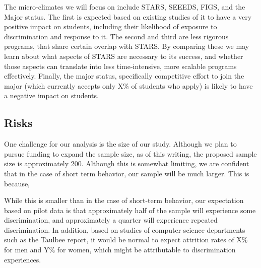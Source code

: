 The micro-climates we will focus on include STARS, SEEEDS, FIGS, and the Major status. The first is expected based on existing studies of it to have a very positive impact on students, including their likelihood of exposure to discrimination and response to it. The second and third are less rigorous programs, that share certain overlap with STARS. By comparing these we may learn about what aspects of STARS are necessary to its success, and whether those aspects can translate into less time-intensive, more scalable programs effectively. Finally, the major status, specifically competitive effort to join the major (which currently accepts only X\% of students who apply) is likely to have a negative impact on students. 

\subsection{Risks}
One challenge for our analysis is the size of our study. Although we plan to pursue funding to expand the sample size, as of this writing, the proposed sample size is approximately 200. Although this is somewhat limiting, we are confident that in the case of short term behavior, our sample will be much larger. This is because, 



While this is smaller than in the case of short-term behavior, our expectation based on pilot data is that approximately half of the sample will experience some discrimination, and approximately a quarter will experience repeated discrimination. In addition, based on studies of computer science departments such as the Taulbee report, \cite{} it would be normal to expect attrition rates of X\% for men and Y\% for women, which might be attributable to discrimination experiences. 


